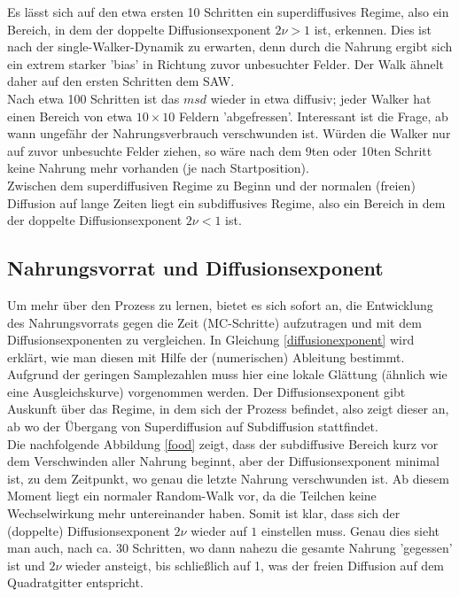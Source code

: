 \documentclass[a4paper, 12pt]{report}
\begin{document}
\noindent Es lässt sich auf den etwa ersten 10 Schritten ein superdiffusives Regime, also ein Bereich, in dem der doppelte Diffusionsexponent $2\nu > 1$ ist, erkennen. Dies ist nach der single-Walker-Dynamik zu erwarten, denn durch die Nahrung ergibt sich ein extrem starker 'bias' in Richtung zuvor unbesuchter Felder. Der Walk ähnelt daher auf den ersten Schritten dem SAW.
\\
\noindent Nach etwa 100 Schritten ist das $msd$ wieder in etwa diffusiv; jeder Walker hat einen Bereich von etwa $10\times 10$ Feldern 'abgefressen'. Interessant ist die Frage, ab wann ungefähr der Nahrungsverbrauch verschwunden ist. Würden die Walker nur auf zuvor unbesuchte Felder ziehen, so wäre nach dem 9ten oder 10ten Schritt keine Nahrung mehr vorhanden (je nach Startposition).
\\
\noindent Zwischen dem superdiffusiven Regime zu Beginn und der normalen (freien) Diffusion auf lange Zeiten liegt ein subdiffusives Regime, also ein Bereich in dem der doppelte Diffusionsexponent $2\nu < 1$ ist.

\subsection{Nahrungsvorrat und Diffusionsexponent}
Um mehr über den Prozess zu lernen, bietet es sich sofort an, die Entwicklung des Nahrungsvorrats gegen die Zeit (MC-Schritte) aufzutragen und mit dem Diffusionsexponenten zu vergleichen. In Gleichung \ref{diffusionexponent} wird erklärt, wie man diesen mit Hilfe der (numerischen) Ableitung bestimmt. Aufgrund der geringen Samplezahlen muss hier eine lokale Glättung (ähnlich wie eine Ausgleichskurve) vorgenommen werden. Der Diffusionsexponent gibt Auskunft über das Regime, in dem sich der Prozess befindet, also zeigt dieser an, ab wo der Übergang von Superdiffusion auf Subdiffusion stattfindet.
\\
\noindent Die nachfolgende Abbildung \ref{food} zeigt, dass der subdiffusive Bereich kurz vor dem Verschwinden aller Nahrung beginnt, aber der Diffusionsexponent minimal ist, zu dem Zeitpunkt, wo genau die letzte Nahrung verschwunden ist. Ab diesem Moment liegt ein normaler Random-Walk vor, da die Teilchen keine Wechselwirkung mehr untereinander haben. Somit ist klar, dass sich der (doppelte) Diffusionsexponent $2\nu$ wieder auf $1$ einstellen muss. Genau dies sieht man auch, nach ca. 30 Schritten, wo dann nahezu die gesamte Nahrung 'gegessen' ist und $2\nu$ wieder ansteigt, bis schließlich auf 1, was der freien Diffusion auf dem Quadratgitter entspricht.
\end{document}
